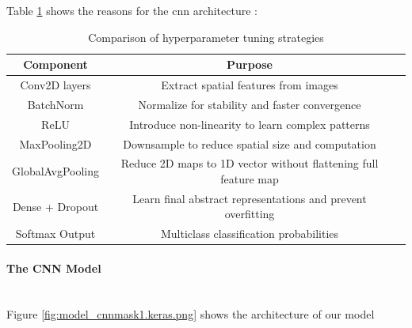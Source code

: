 \documentclass{article}
\begin{document}
Table \ref{tab:cnn_architecture} shows the reasons for the cnn architecture :
\begin{table}[h]
    \centering
    \renewcommand{\arraystretch}{1.3}
    \begin{tabular}{|c|c|p{8cm}|}
        \hline
        \textbf{Component} & \textbf{Purpose} \\ \hline
        Conv2D layers & Extract spatial features from images \\ \hline
        BatchNorm & Normalize for stability and faster convergence \\ \hline
        ReLU & Introduce non-linearity to learn complex patterns \\ \hline
        MaxPooling2D & Downsample to reduce spatial size and computation \\ \hline
        GlobalAvgPooling & Reduce 2D maps to 1D vector without flattening full feature map \\ \hline
        Dense + Dropout & Learn final abstract representations and prevent overfitting \\ \hline
        Softmax Output	& Multiclass classification probabilities \\ \hline
    \end{tabular}
    \caption{Comparison of hyperparameter tuning strategies}
    \label{tab:cnn_architecture}
\end{table}
\paragraph{The CNN Model}\mbox{}\\
Figure \ref{fig:model_cnnmask1.keras.png} shows the architecture of our model
\end{document}
